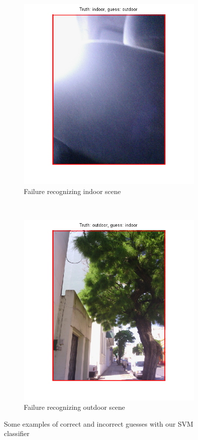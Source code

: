 \begin{figure}[!htb]
	\begin{subfigure}[t]{0.4\textwidth}
		\includegraphics[width=\textwidth]{./img/ex2/indoor-failed.png}
		\caption{Failure recognizing indoor scene}
		\label{fig:indoor-failed}
	\end{subfigure}
	~
	\begin{subfigure}[t]{0.4\textwidth}
		\includegraphics[width=\textwidth]{./img/ex2/outdoor-failed.png}
		\caption{Failure recognizing outdoor scene}
		\label{fig:outdoor-failed}
	\end{subfigure}
	
\caption{Some examples of correct and incorrect guesses with our SVM classifier}
\label{fig:svm-graphical-results}
\end{figure}

